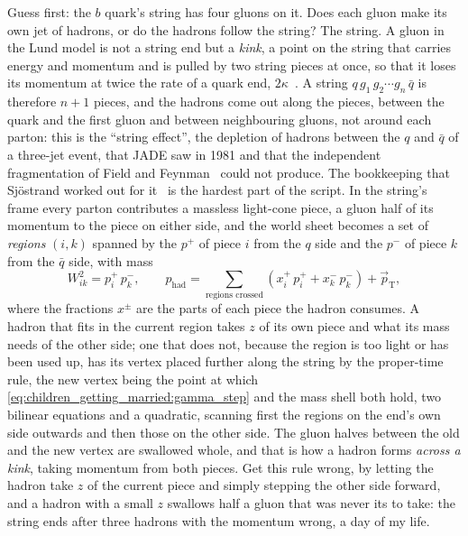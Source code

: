 Guess first: the $b$ quark's string has four gluons on it. Does each gluon
make its own jet of hadrons, or do the hadrons follow the string? The
string. A gluon in the Lund model is not a string end but a \emph{kink}, a
point on the string that carries energy and momentum and is pulled by two
string pieces at once, so that it loses its momentum at twice the rate of a
quark end, $2\kappa$~\cite{Andersson:1983ia}. A string
$q\,g_1\,g_2\cdots g_n\,\bar q$ is therefore $n+1$ pieces, and the hadrons
come out along the pieces, between the quark and the first gluon and
between neighbouring gluons, not around each parton: this is the ``string
effect'', the depletion of hadrons between the $q$ and $\bar q$ of a
three-jet event, that JADE saw in 1981 and that the independent
fragmentation of Field and Feynman~\cite{Field:1977fa} could not produce.
The bookkeeping that Sj\"ostrand worked out for it~\cite{Sjostrand:1984ic}
is the hardest part of the script. In the string's frame every parton
contributes a massless light-cone piece, a gluon half of its momentum to
the piece on either side, and the world sheet becomes a set of
\emph{regions} $(i,k)$ spanned by the $p^+$ of piece $i$ from the $q$ side
and the $p^-$ of piece $k$ from the $\bar q$ side, with mass
\begin{equation}
  W_{ik}^2=p_i^+\,p_k^-,
  \qquad
  p_{\mathrm{had}}=\sum_{\text{regions crossed}}
  \left(x^+_{i}\,p_i^+ + x^-_{k}\,p_k^-\right)+\vec p_{\mathrm{T}},
  \label{eq:children_getting_married:regions}
\end{equation}
where the fractions $x^\pm$ are the parts of each piece the hadron
consumes. A hadron that fits in the current region takes $z$ of its own
piece and what its mass needs of the other side; one that does not, because
the region is too light or has been used up, has its vertex placed further
along the string by the proper-time rule, the new vertex being the point at
which \cref{eq:children_getting_married:gamma_step} and the mass shell both
hold, two bilinear equations and a quadratic, scanning first the regions on
the end's own side outwards and then those on the other side. The gluon
halves between the old and the new vertex are swallowed whole, and that is
how a hadron forms \emph{across a kink}, taking momentum from both pieces.
Get this rule wrong, by letting the hadron take $z$ of the current piece
and simply stepping the other side forward, and a hadron with a small $z$
swallows half a gluon that was never its to take: the string ends after
three hadrons with the momentum wrong, a day of my life.

